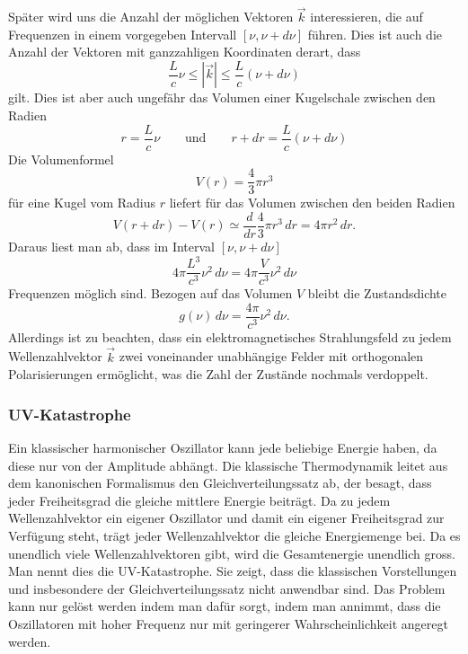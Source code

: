 Später wird uns die Anzahl der möglichen Vektoren $\vec{k}$ interessieren,
die auf Frequenzen in einem vorgegeben Intervall $[\nu, \nu+d\nu]$
führen.
Dies ist auch die Anzahl der Vektoren mit ganzzahligen Koordinaten derart,
dass
\[
\frac{L}{c}\nu
\le
|\vec{k}|
\le
\frac{L}{c}(\nu+d\nu)
\]
gilt.
Dies ist aber auch ungefähr das Volumen einer Kugelschale zwischen den
Radien 
\[
r=\frac{L}{c}\nu
\qquad\text{und}\qquad
r+dr=\frac{L}{c}(\nu+d\nu)
\]
Die Volumenformel
\[
V(r)
=
\frac{4}{3}\pi r^3
\]
für eine Kugel vom Radius $r$ liefert für das Volumen
zwischen den beiden Radien
\[
V(r+dr)-V(r)
\simeq
\frac{d}{dr} \frac{4}{3}\pi  r^3 \, dr
=
4\pi r^2\,dr.
\]
Daraus liest man ab, dass im Interval $[\nu,\nu+d\nu]$ 
\[
4\pi \frac{L^3}{c^3}\nu^2\,d\nu
=
4\pi \frac{V}{c^3}\nu^2\,d\nu
\]
Frequenzen möglich sind.
Bezogen auf das Volumen $V$ bleibt die Zustandsdichte
\begin{equation}
g(\nu)\,d\nu = \frac{4\pi}{c^3}\nu^2\,d\nu.
\label{skript:cmb:zustandsdichte}
\end{equation}
Allerdings ist zu beachten, dass ein elektromagnetisches Strahlungsfeld
zu jedem Wellenzahlvektor $\vec{k}$ zwei voneinander unabhängige 
Felder mit orthogonalen Polarisierungen ermöglicht, was die Zahl
der Zustände nochmals verdoppelt.

\subsubsection{UV-Katastrophe}
Ein klassischer harmonischer Oszillator kann jede beliebige Energie haben,
da diese nur von der Amplitude abhängt.
Die klassische Thermodynamik leitet aus dem kanonischen Formalismus den
Gleichverteilungssatz ab, der besagt,
dass jeder Freiheitsgrad die gleiche mittlere Energie beiträgt.
Da zu jedem Wellenzahlvektor ein eigener Oszillator und damit ein 
eigener Freiheitsgrad zur Verfügung steht, trägt jeder Wellenzahlvektor
die gleiche Energiemenge bei.
Da es unendlich viele Wellenzahlvektoren gibt, wird die Gesamtenergie
unendlich gross.
Man nennt dies die UV-Katastrophe.
Sie zeigt, dass die klassischen Vorstellungen und insbesondere der
Gleichverteilungssatz nicht anwendbar sind.
Das Problem kann nur gelöst werden indem man dafür sorgt, indem man
annimmt, dass die Oszillatoren mit hoher Frequenz nur mit geringerer
Wahrscheinlichkeit angeregt werden.

